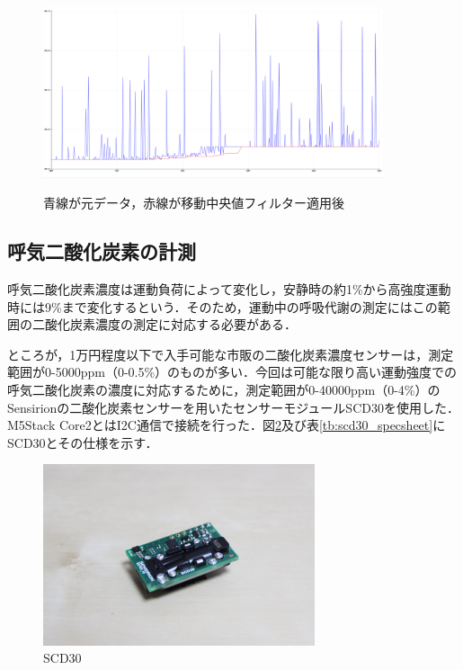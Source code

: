 \begin{figure}[H]
  \begin{center}
    \caption{青線が元データ，赤線が移動中央値フィルター適用後}
    \includegraphics[width=10cm]{fig/running_median_graph}
    \label{fig:running_median_graph}
  \end{center}
\end{figure}

\subsection{呼気二酸化炭素の計測}

呼気二酸化炭素濃度は運動負荷によって変化し，安静時の約1\%から高強度運動時には9\%まで変化するという\cite{co2_percent}．そのため，運動中の呼吸代謝の測定にはこの範囲の二酸化炭素濃度の測定に対応する必要がある．

ところが，1万円程度以下で入手可能な市販の二酸化炭素濃度センサーは，測定範囲が0-5000ppm（0-0.5\%）のものが多い．今回は可能な限り高い運動強度での呼気二酸化炭素の濃度に対応するために，測定範囲が0-40000ppm（0-4\%）のSensirionの二酸化炭素センサーを用いたセンサーモジュールSCD30を使用した．M5Stack Core2とはI2C通信で接続を行った．図\ref{fig:scd30}及び表\ref{tb:scd30_specsheet}にSCD30とその仕様を示す．

\begin{figure}[H]
  \begin{center}
    \includegraphics[width=8cm]{fig/scd30}
    \caption{SCD30}
    \label{fig:scd30}
  \end{center}
\end{figure}

